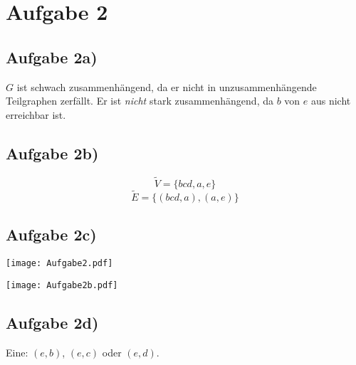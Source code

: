 \documentclass[a4paper,10pt]{article}
\begin{document}
\newpage
\section*{Aufgabe 2}

\subsection*{Aufgabe 2a)}

$G$ ist schwach zusammenhängend, da er nicht in unzusammenhängende Teilgraphen zerfällt. Er ist 
\textit{nicht} stark zusammenhängend, da $b$ von $e$ aus nicht erreichbar ist.

\subsection*{Aufgabe 2b)}

\[\widetilde{V} = \{bcd, a, e\}\]
\[\widetilde{E} = \{(bcd, a), (a, e)\}\]

\subsection*{Aufgabe 2c)}

\begin{minipage}{0.49\textwidth}
    \begin{center}
        \texttt{[image: Aufgabe2.pdf]}
    \end{center}
\end{minipage}
\begin{minipage}{0.49\textwidth}
    \begin{center}
        \texttt{[image: Aufgabe2b.pdf]}
    \end{center}
\end{minipage}

\subsection*{Aufgabe 2d)}

Eine: $(e, b)$, $(e, c)$ oder $(e, d)$.
\end{document}
